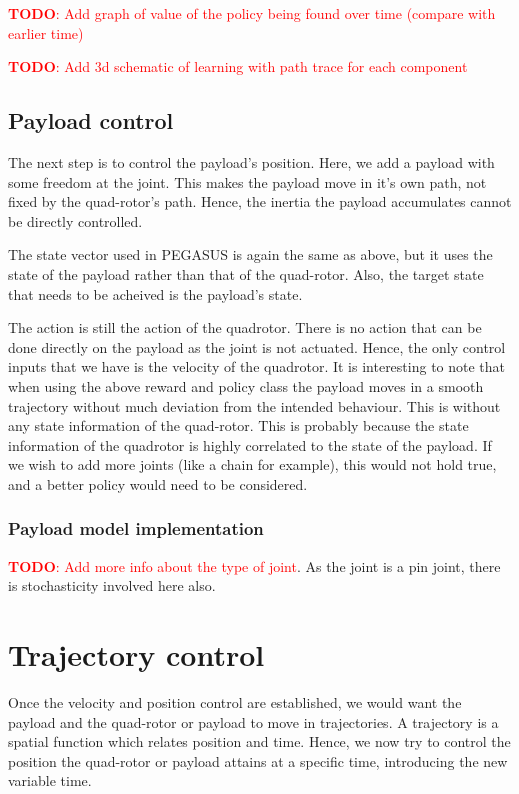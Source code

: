 \documentclass[BTech]{iitmdiss}
\newcommand\todo[1]{\textcolor{red}{{\bf TODO}: #1}}
\begin{document}
\todo{Add graph of value of the policy being found over time (compare with earlier time)}

\todo{Add 3d schematic of learning with path trace for each component}

\section{Payload control}

The next step is to control the payload's position. Here, we add a payload with some freedom at the joint. This makes the payload move in it's own path, not fixed by the quad-rotor's path. Hence, the inertia the payload accumulates cannot be directly controlled.

The state vector used in PEGASUS is again the same as above, but it uses the state of the payload rather than that of the quad-rotor. Also, the target state that needs to be acheived is the payload's state.

The action is still the action of the quadrotor. There is no action that can be done directly on the payload as the joint is not actuated. Hence, the only control inputs that we have is the velocity of the quadrotor. It is interesting to note that when using the above reward and policy class the payload moves in a smooth trajectory without much deviation from the intended behaviour. This is without any state information of the quad-rotor. This is probably because the state information of the quadrotor is highly correlated to the state of the payload. If we wish to add more joints (like a chain for example), this would not hold true, and a better policy would need to be considered.

\subsection{Payload model implementation}
\todo{Add more info about the type of joint}. As the joint is a pin joint, there is stochasticity involved here also.

\chapter{Trajectory control}

Once the velocity and position control are established, we would want the payload and the quad-rotor or payload to move in trajectories. A trajectory is a spatial function which relates position and time. Hence, we now try to control the position the quad-rotor or payload attains at a specific time, introducing the new variable time.
\end{document}
